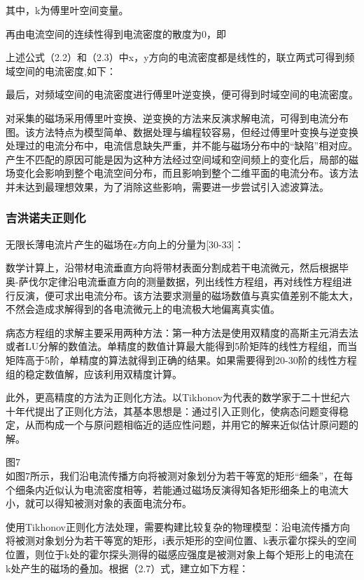 \documentclass[a4paper,12pt，twoside]{ctexart}
\begin{document}
	
	其中，k为傅里叶空间变量。\par 
	再由电流空间的连续性得到电流密度的散度为0，即\par
	上述公式（2.2）和（2.3）中x，y方向的电流密度都是线性的，联立两式可得到频域空间的电流密度,如下：\par
	
	
	最后，对频域空间的电流密度进行傅里叶逆变换，便可得到时域空间的电流密度。\par
	对采集的磁场采用傅里叶变换、逆变换的方法来反演求解电流，可得到电流分布图。该方法特点为模型简单、数据处理与编程较容易，但经过傅里叶变换与逆变换处理过的电流分布中，电流信息缺失严重，并不能与磁场分布中的“缺陷”相对应。产生不匹配的原因可能是因为这种方法经过空间域和空间频上的变化后，局部的磁场变化会影响到整个电流空间分布，而且影响到整个二维平面的电流分布。该方法并未达到最理想效果，为了消除这些影响，需要进一步尝试引入滤波算法。
	
	\subsubsection{吉洪诺夫正则化}
	无限长薄电流片产生的磁场在z方向上的分量为[30-33]：\par
	
	
	数学计算上，沿带材电流垂直方向将带材表面分割成若干电流微元，然后根据毕奥-萨伐尔定律沿电流垂直方向的测量数据，列出线性方程组，再对线性方程组进行反演，便可求出电流分布。该方法要求测量的磁场数值与真实值差别不能太大，不然会造成求解得到的各电流微元上的电流极大地偏离真实值。\par
	病态方程组的求解主要采用两种方法：第一种方法是使用双精度的高斯主元消去法或者LU分解的数值法。单精度的数值计算最大能得到5阶矩阵的线性方程组，而当矩阵高于5阶，单精度的算法就得到正确的结果。如果需要得到20-30阶的线性方程组的稳定数值解，应该利用双精度计算。\par
	此外，更高精度的方法为正则化方法。以Tikhonov为代表的数学家于二十世纪六十年代提出了正则化方法，其基本思想是：通过引入正则化，使病态问题变得稳定，从而构成一个与原问题相临近的适应性问题，并用它的解来近似估计原问题的解。\par
		
			图7\\
	如图7所示，我们沿电流传播方向将被测对象划分为若干等宽的矩形“细条”，在每个细条内近似认为电流密度相等，若能通过磁场反演得知各矩形细条上的电流大小，就可以得知被测对象的表面电流分布。\par
	使用Tikhonov正则化方法处理，需要构建比较复杂的物理模型：沿电流传播方向将被测对象划分为若干等宽的矩形，i表示矩形的空间位置、k表示霍尔探头的空间位置，则位于k处的霍尔探头测得的磁感应强度是被测对象上每个矩形上的电流在k处产生的磁场的叠加。根据（2.7）式，建立如下方程：\par
	
\end{document}
